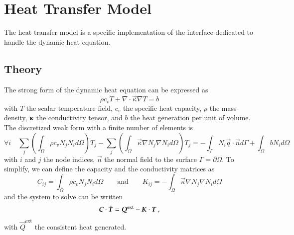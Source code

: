 \chapter{Heat Transfer Model}

The heat transfer model is a specific implementation of the  interface
dedicated to handle the dynamic heat equation.
\section{Theory}
The strong form of the dynamic heat equation
can be expressed as
\begin{equation}
  \rho c_v \dot{T} + \nabla \cdot \vec{\kappa} \nabla T = b
\end{equation}
with $T$ the scalar temperature field,
$c_v$ the specific heat capacity,
$\rho$ the mass density,
$\boldsymbol{\kappa}$ the conductivity tensor, and $b$ the heat generation per unit of volume.
The discretized weak form with a finite number of elements is
\begin{equation}
  \forall i \quad
  \sum_j \left( \int_\Omega \rho c_v N_j N_i  d\Omega \right) \dot{T}_j
  - \sum_j \left( \int_\Omega \vec{\kappa} \nabla N_j \nabla N_i d\Omega \right) T_j =
  - \int_{\Gamma}  N_i \vec{q} \cdot \vec{n} d\Gamma + \int_\Omega b N_i d\Omega
\end{equation}
with $i$ and $j$ the node indices, $\vec{n}$ the normal field to the surface
$\Gamma = \partial \Omega$.
To simplify, we can define the capacity and the conductivity matrices as
\begin{equation}
  C_{ij} = \int_\Omega \rho c_v N_j N_i  d\Omega \qquad \textrm{and} \qquad
  K_{ij} = - \int_\Omega \vec{\kappa} \nabla N_j \nabla N_i d\Omega
\end{equation}
and the system to solve can be written
\begin{equation}
  \boldsymbol{C} \cdot \boldsymbol{\dot{T}} = \boldsymbol{Q}^{\text{ext}} -\boldsymbol{K} \cdot \boldsymbol{T}~,
\end{equation}
with $\vec{Q}^{\text{ext}}$ the consistent heat generated.

